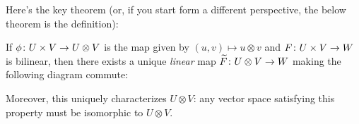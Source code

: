 Here's the key theorem (or, if you start form a different perspective, the below theorem is the definition):

\begin{theorem}\label{thm:tensor product universal property}
	If $\phi\colon\thinspace\! U \times V \to U \otimes V$ is the map given by $(u,v) \mapsto u \otimes v$ and $F \colon\thinspace\! U \times V \to W$ is bilinear, then there exists a unique \emph{linear} map $\widetilde{F} \colon\thinspace\! U \otimes V \to W$ making the following diagram commute:
	\begin{center}
	\end{center}
	Moreover, this uniquely characterizes $U \otimes V$: any vector space satisfying this property must be isomorphic to $U \otimes V$.
\end{theorem}


